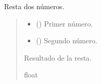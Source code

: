 \documentclass[a4paper,10pt,spanish]{sphinxmanual}
\begin{document}
\begin{fulllineitems}
\label{\detokenize{1_configuracion_inicial/src:src.operaciones.resta}}
\pysigstartsignatures
\pysiglinewithargsret
{}
{\sphinxparamcomma {}}
{}
\pysigstopsignatures
\sphinxAtStartPar
Resta dos números.
\begin{quote}\begin{description}
\begin{itemize}
\item {} 
\sphinxAtStartPar
{} () \textendash{} Primer número.

\item {} 
\sphinxAtStartPar
{} () \textendash{} Segundo número.

\end{itemize}

\sphinxAtStartPar
Resultado de la resta.

\sphinxAtStartPar
float

\end{description}\end{quote}

\end{fulllineitems}

\end{document}
